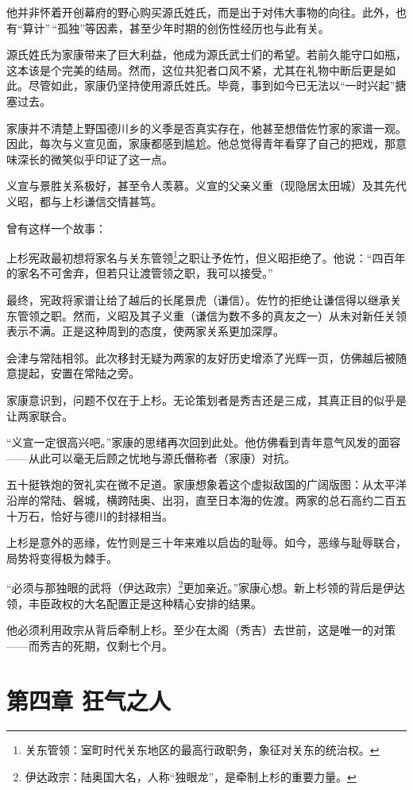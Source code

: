 \documentclass[
]{book}
\begin{document}
他并非怀着开创幕府的野心购买源氏姓氏，而是出于对伟大事物的向往。此外，也有``算计''\,``孤独''等因素，甚至少年时期的创伤性经历也与此有关。

源氏姓氏为家康带来了巨大利益，他成为源氏武士们的希望。若前久能守口如瓶，这本该是个完美的结局。然而，这位共犯者口风不紧，尤其在礼物中断后更是如此。尽管如此，家康仍坚持使用源氏姓氏。毕竟，事到如今已无法以``一时兴起''搪塞过去。

家康并不清楚上野国德川乡的义季是否真实存在，他甚至想借佐竹家的家谱一观。因此，每次与义宣见面，家康都感到尴尬。他总觉得青年看穿了自己的把戏，那意味深长的微笑似乎印证了这一点。

义宣与景胜关系极好，甚至令人羡慕。义宣的父亲义重（现隐居太田城）及其先代义昭，都与上杉谦信交情甚笃。

曾有这样一个故事：

上杉宪政最初想将家名与关东管领\footnote{关东管领：室町时代关东地区的最高行政职务，象征对关东的统治权。}之职让予佐竹，但义昭拒绝了。他说：``四百年的家名不可舍弃，但若只让渡管领之职，我可以接受。''

最终，宪政将家谱让给了越后的长尾景虎（谦信）。佐竹的拒绝让谦信得以继承关东管领之职。然而，义昭及其子义重（谦信为数不多的真友之一）从未对新任关领表示不满。正是这种周到的态度，使两家关系更加深厚。

会津与常陆相邻。此次移封无疑为两家的友好历史增添了光辉一页，仿佛越后被随意提起，安置在常陆之旁。

家康意识到，问题不仅在于上杉。无论策划者是秀吉还是三成，其真正目的似乎是让两家联合。

``义宣一定很高兴吧。''家康的思绪再次回到此处。他仿佛看到青年意气风发的面容------从此可以毫无后顾之忧地与源氏僭称者（家康）对抗。

五十挺铁炮的贺礼实在微不足道。家康想象着这个虚拟敌国的广阔版图：从太平洋沿岸的常陆、磐城，横跨陆奥、出羽，直至日本海的佐渡。两家的总石高约二百五十万石，恰好与德川的封禄相当。

上杉是意外的恶缘，佐竹则是三十年来难以启齿的耻辱。如今，恶缘与耻辱联合，局势将变得极为棘手。

``必须与那独眼的武将（伊达政宗）\footnote{伊达政宗：陆奥国大名，人称``独眼龙''，是牵制上杉的重要力量。}更加亲近。''家康心想。新上杉领的背后是伊达领，丰臣政权的大名配置正是这种精心安排的结果。

他必须利用政宗从背后牵制上杉。至少在太阁（秀吉）去世前，这是唯一的对策------而秀吉的死期，仅剩七个月。

\chapter*{第四章 狂气之人}\label{ux7b2cux56dbux7ae0-ux72c2ux6c14ux4e4bux4eba}
\end{document}
